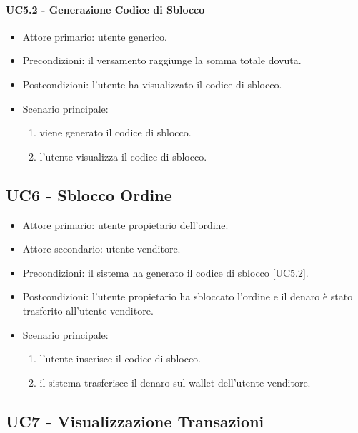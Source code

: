 \paragraph{UC5.2 - Generazione Codice di Sblocco}

\begin{itemize}
    \item Attore primario: utente generico.
    \item Precondizioni: il versamento raggiunge la somma totale dovuta.
    \item Postcondizioni: l'utente ha visualizzato il codice di sblocco.
    \item Scenario principale: \begin{enumerate}
        \item viene generato il codice di sblocco.
        \item l'utente visualizza il codice di sblocco.
    \end{enumerate}
\end{itemize}

\subsection{UC6 - Sblocco Ordine}

\begin{itemize}
    \item Attore primario: utente propietario dell'ordine.
    \item Attore secondario: utente venditore.
    \item Precondizioni: il sistema ha generato il codice di sblocco [UC5.2]. 
    \item Postcondizioni: l'utente propietario ha sbloccato l'ordine e il denaro è stato trasferito all'utente venditore.
    \item Scenario principale: \begin{enumerate}
        \item l'utente inserisce il codice di sblocco.
        \item il sistema trasferisce il denaro sul wallet dell'utente venditore.
    \end{enumerate}
\end{itemize}

\subsection{UC7 - Visualizzazione Transazioni}

